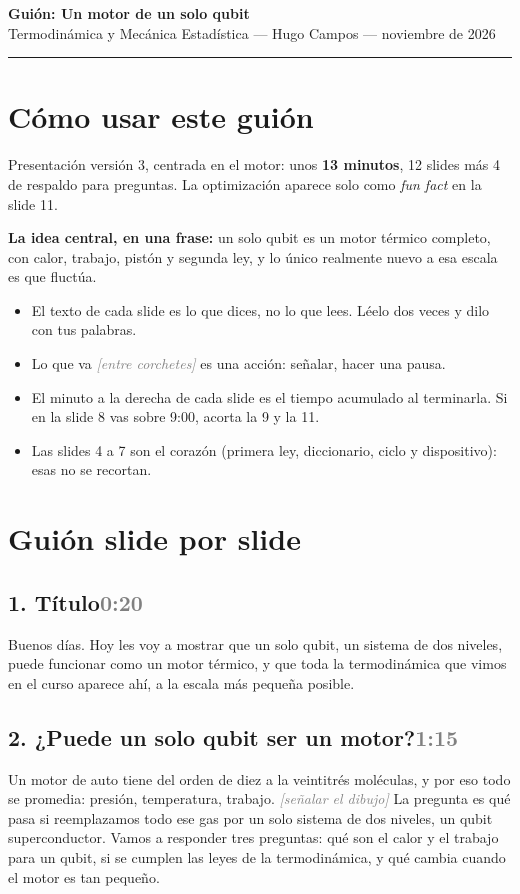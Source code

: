\documentclass[11pt,a4paper]{article}
\newcommand{\acc}[1]{\textcolor{gray}{\textit{[#1]}}}
\newcommand{\slide}[2]{\subsection{#1\hfill\normalfont\small\textcolor{gray}{#2}}}
\begin{document}
{\LARGE\bfseries\color{usmBlue} Guión: Un motor de un solo qubit}\\[0.3em]
{\large Termodinámica y Mecánica Estadística — Hugo Campos — noviembre de 2026}

\vspace{0.8em}
\hrule
\vspace{0.6em}

\section*{Cómo usar este guión}

Presentación versión 3, centrada en el motor: unos \textbf{13 minutos}, 12 slides más 4 de respaldo para preguntas. La optimización aparece solo como \emph{fun fact} en la slide 11.

\textbf{La idea central, en una frase:} un solo qubit es un motor térmico completo, con calor, trabajo, pistón y segunda ley, y lo único realmente nuevo a esa escala es que fluctúa.

\begin{itemize}
\item El texto de cada slide es lo que dices, no lo que lees. Léelo dos veces y dilo con tus palabras.
\item Lo que va \acc{entre corchetes} es una acción: señalar, hacer una pausa.
\item El minuto a la derecha de cada slide es el tiempo acumulado al terminarla. Si en la slide 8 vas sobre 9:00, acorta la 9 y la 11.
\item Las slides 4 a 7 son el corazón (primera ley, diccionario, ciclo y dispositivo): esas no se recortan.
\end{itemize}

\section*{Guión slide por slide}

\slide{1. Título}{0:20}
Buenos días. Hoy les voy a mostrar que un solo qubit, un sistema de dos niveles, puede funcionar como un motor térmico, y que toda la termodinámica que vimos en el curso aparece ahí, a la escala más pequeña posible.

\slide{2. ¿Puede un solo qubit ser un motor?}{1:15}
Un motor de auto tiene del orden de diez a la veintitrés moléculas, y por eso todo se promedia: presión, temperatura, trabajo. \acc{señalar el dibujo} La pregunta es qué pasa si reemplazamos todo ese gas por un solo sistema de dos niveles, un qubit superconductor. Vamos a responder tres preguntas: qué son el calor y el trabajo para un qubit, si se cumplen las leyes de la termodinámica, y qué cambia cuando el motor es tan pequeño.
\end{document}
